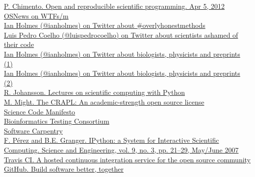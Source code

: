 \documentclass[slidestop]{beamer}
\begin{document}
\begin{frame}
{    \href{https://speakerdeck.com/ptomato/open-and-reproducible-scientific-programming}{P. Chimento. Open and reproducible scientific programming. Apr 5, 2012}\\
    \href{http://www.osnews.com/story/19266/WTFs_m}{OSNews on WTFs/m}\\
    \href{https://twitter.com/ianholmes/status/288689712636493824}{Ian Holmes (@ianholmes) on Twitter about \#overlyhonestmethods}\\
    \href{https://twitter.com/luispedrocoelho/status/238632048313647104}{Luis Pedro Coelho (@luispedrocoelho) on Twitter about scientists ashamed of their code}\\
    \href{https://twitter.com/ianholmes/status/250608615361241089}{Ian Holmes (@ianholmes) on Twitter about biologists, physicists and preprints (1)}\\
    \href{https://twitter.com/ianholmes/status/250608825428746242}{Ian Holmes (@ianholmes) on Twitter about biologists, physicists and preprints (2)}\\
    \href{http://jrjohansson.github.com/}{R. Johansson. Lectures on scientific computing with Python}\\
    \href{http://matt.might.net/articles/crapl/}{M. Might. The CRAPL: An academic-strength open source license}\\
    \href{http://sciencecodemanifesto.org/}{Science Code Manifesto}\\
    \href{http://biotest.cgrb.oregonstate.edu/}{Bioinformatics Testing Consortium}\\
    \href{http://software-carpentry.org/}{Software Carpentry}\\
    \href{http://ipython.org/}{F. P\'erez and B.E. Granger. IPython: a System for Interactive Scientific Computing. Science and Engineering, vol. 9, no. 3, pp. 21--29, May/June 2007}\\
    \href{https://travis-ci.org/}{Travis CI. A hosted continuous integration service for the open source community}\\
    \href{https://github.com/}{GitHub. Build software better, together}\\
  }
\end{frame}
\end{document}
